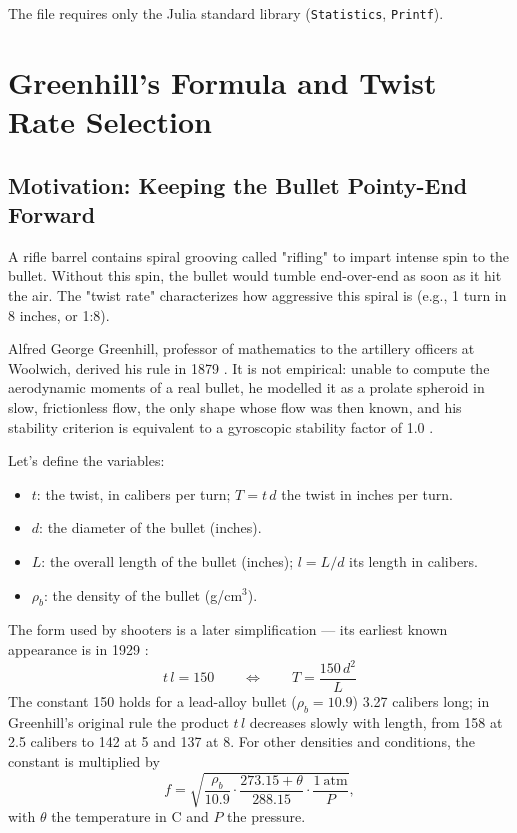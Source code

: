 \documentclass[11pt,twoside,openright]{report}
\begin{document}
The file requires only the Julia standard library (\texttt{Statistics}, \texttt{Printf}).


\chapter{Greenhill's Formula and Twist Rate Selection}
\label{app:greenhill}

\section{Motivation: Keeping the Bullet Pointy-End Forward}
A rifle barrel contains spiral grooving called "rifling" to impart intense spin to the bullet. Without this spin, the bullet would tumble end-over-end as soon as it hit the air. The "twist rate" characterizes how aggressive this spiral is (e.g., 1 turn in 8 inches, or 1:8). 

Alfred George Greenhill, professor of mathematics to the artillery officers at Woolwich, derived his rule in 1879 \citep{greenhill1879rotation}. It is not empirical: unable to compute the aerodynamic moments of a real bullet, he modelled it as a prolate spheroid in slow, frictionless flow, the only shape whose flow was then known, and his stability criterion is equivalent to a gyroscopic stability factor of 1.0 \citep{miller2006greenhill}.

Let's define the variables:
\begin{itemize}[noitemsep]
    \item $t$: the twist, in calibers per turn; $T = t\,d$ the twist in inches per turn.
    \item $d$: the diameter of the bullet (inches).
    \item $L$: the overall length of the bullet (inches); $l = L/d$ its length in calibers.
    \item $\rho_b$: the density of the bullet (g/cm$^3$).
\end{itemize}

The form used by shooters is a later simplification --- its earliest known appearance is in 1929 \citep{miller2006greenhill}:
\begin{equation}
  \boxed{t\,l = 150 \qquad\Longleftrightarrow\qquad T = \frac{150\,d^2}{L}}
  \label{eq:greenhill}
\end{equation}
The constant 150 holds for a lead-alloy bullet ($\rho_b = 10.9$) 3.27 calibers long; in Greenhill's original rule the product $t\,l$ decreases slowly with length, from 158 at 2.5 calibers to 142 at 5 and 137 at 8. For other densities and conditions, the constant is multiplied by
\[
  f = \sqrt{\frac{\rho_b}{10.9}\cdot\frac{273.15 + \theta}{288.15}\cdot\frac{1~\text{atm}}{P}},
\]
with $\theta$ the temperature in \textdegree C and $P$ the pressure.
\end{document}
